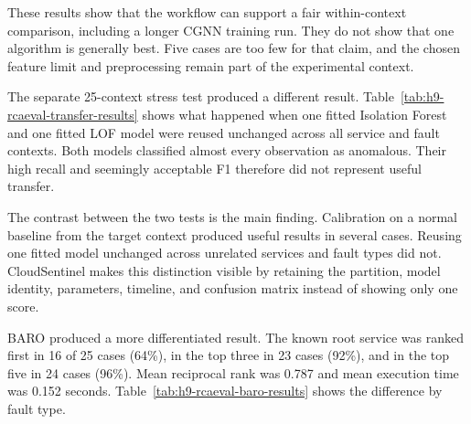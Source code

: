 These results show that the workflow can support a fair within-context comparison, including a longer CGNN training run. They do not show that one algorithm is generally best. Five cases are too few for that claim, and the chosen feature limit and preprocessing remain part of the experimental context.

The separate 25-context stress test produced a different result. Table~\ref{tab:h9-rcaeval-transfer-results} shows what happened when one fitted Isolation Forest and one fitted LOF model were reused unchanged across all service and fault contexts. Both models classified almost every observation as anomalous. Their high recall and seemingly acceptable F1 therefore did not represent useful transfer.

\begin{table}[H]
    \centering
    \scriptsize
    \caption{Cross-context transfer stress test across 25 Train Ticket cases.}
    \label{tab:h9-rcaeval-transfer-results}
\end{table}

The contrast between the two tests is the main finding. Calibration on a normal baseline from the target context produced useful results in several cases. Reusing one fitted model unchanged across unrelated services and fault types did not. CloudSentinel makes this distinction visible by retaining the partition, model identity, parameters, timeline, and confusion matrix instead of showing only one score.

BARO produced a more differentiated result. The known root service was ranked first in 16 of 25 cases (64\%), in the top three in 23 cases (92\%), and in the top five in 24 cases (96\%). Mean reciprocal rank was 0.787 and mean execution time was 0.152 seconds. Table~\ref{tab:h9-rcaeval-baro-results} shows the difference by fault type.

